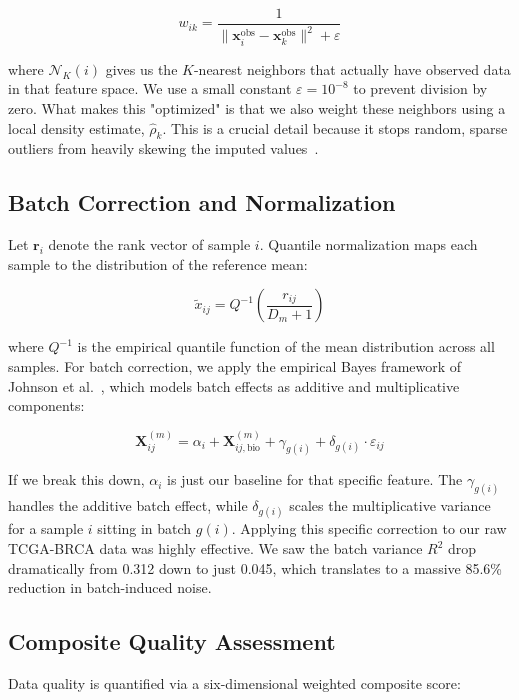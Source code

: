 \documentclass[runningheads]{llncs}
\begin{document}
\begin{equation}
w_{ik} = \frac{1}{\|\mathbf{x}_i^{\text{obs}} - \mathbf{x}_k^{\text{obs}}\|^2 + \varepsilon}
\end{equation}

where $\mathcal{N}_K(i)$ gives us the $K$-nearest neighbors that actually have observed data in that feature space. We use a small constant $\varepsilon = 10^{-8}$ to prevent division by zero. What makes this "optimized" is that we also weight these neighbors using a local density estimate, $\hat{\rho}_k$. This is a crucial detail because it stops random, sparse outliers from heavily skewing the imputed values~\cite{troyanskaya2001}.

\subsection{Batch Correction and Normalization}
Let $\mathbf{r}_i$ denote the rank vector of sample $i$. Quantile normalization maps each sample to the distribution of the reference mean:

\begin{equation}
\tilde{x}_{ij} = Q^{-1}\left(\frac{r_{ij}}{D_m + 1}\right)
\end{equation}

where $Q^{-1}$ is the empirical quantile function of the mean distribution across all samples. For batch correction, we apply the empirical Bayes framework of Johnson et al.~\cite{johnson2007}, which models batch effects as additive and multiplicative components:

\begin{equation}
\mathbf{X}^{(m)}_{ij} = \alpha_i + \mathbf{X}^{(m)}_{ij,\text{bio}} + \gamma_{g(i)} + \delta_{g(i)} \cdot \varepsilon_{ij}
\end{equation}

If we break this down, $\alpha_i$ is just our baseline for that specific feature. The $\gamma_{g(i)}$ handles the additive batch effect, while $\delta_{g(i)}$ scales the multiplicative variance for a sample $i$ sitting in batch $g(i)$. Applying this specific correction to our raw TCGA-BRCA data was highly effective. We saw the batch variance $R^2$ drop dramatically from 0.312 down to just 0.045, which translates to a massive 85.6\% reduction in batch-induced noise.

\subsection{Composite Quality Assessment}
Data quality is quantified via a six-dimensional weighted composite score:
\end{document}
